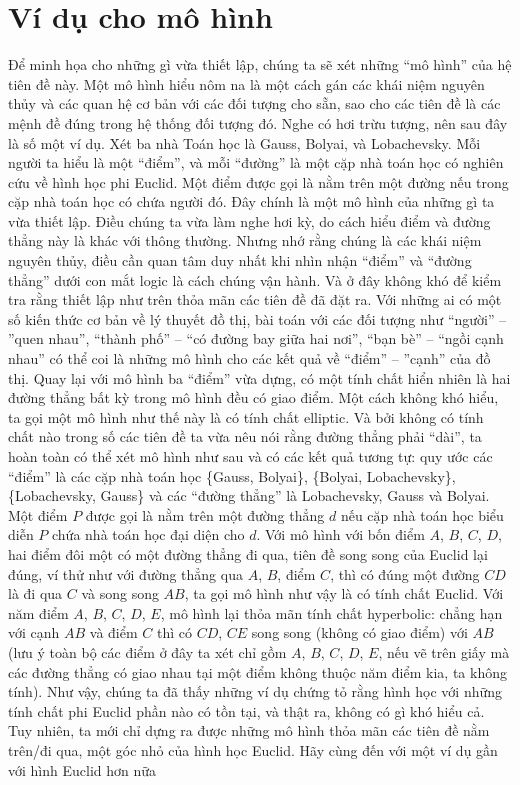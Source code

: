 \section{Ví dụ cho mô hình}
	Để minh họa cho những gì vừa thiết lập, chúng ta sẽ xét những ``mô hình'' của hệ tiên đề này. Một mô hình hiểu nôm na là một cách gán các khái niệm nguyên thủy và các quan hệ cơ bản với các đối tượng cho sẵn, sao cho các tiên đề là các mệnh đề đúng trong hệ thống đối tượng đó. Nghe có hơi trừu tượng, nên sau đây là số một ví dụ.
	\vskip 0.1cm
 Xét ba nhà Toán học là Gauss, Bolyai, và Lobachevsky. Mỗi người ta hiểu là một ``điểm'', và mỗi ``đường'' là một cặp nhà toán học có nghiên cứu về hình học phi Euclid. Một điểm được gọi là nằm trên một đường nếu trong cặp nhà toán học có chứa người đó. Đây chính là một mô hình của những gì ta vừa thiết lập.
	\vskip 0.1cm
	Điều chúng ta vừa làm nghe hơi kỳ, do cách hiểu điểm và đường thẳng này là khác với thông thường. Nhưng nhớ rằng chúng là các khái niệm nguyên thủy, điều cần quan tâm duy nhất khi nhìn nhận ``điểm'' và ``đường thẳng'' dưới con mắt logic là cách chúng vận hành. Và ở đây không khó để kiểm tra rằng thiết lập như trên thỏa mãn các tiên đề đã đặt ra. Với những ai có một số kiến thức cơ bản về lý thuyết đồ thị, bài toán với các đối tượng như ``người'' -- ''quen nhau'', ``thành phố'' -- ``có đường bay giữa hai nơi'', ``bạn bè'' -- ``ngồi cạnh nhau'' có thể coi là những mô hình cho các kết quả về ``điểm'' -- ''cạnh'' của đồ thị. 
	\vskip 0.1cm
	Quay lại với mô hình ba ``điểm'' vừa dựng, có một tính chất hiển nhiên là hai đường thẳng bất kỳ trong mô hình đều có giao điểm. Một cách không khó hiểu, ta gọi một mô hình như thế này là có tính chất elliptic.
	\vskip 0.1cm
	Và bởi không có tính chất nào trong số các tiên đề ta vừa nêu nói rằng đường thẳng phải ``dài'', ta hoàn toàn có thể xét mô hình như sau và có các kết quả tương tự: quy ước các ``điểm'' là các cặp nhà toán học \{Gauss, Bolyai\}, \{Bolyai, Lobachevsky\}, \{Lobachevsky, Gauss\} và các ``đường thẳng'' là Lobachevsky, Gauss và Bolyai. Một điểm $P$ được gọi là nằm trên một đường thẳng $d$ nếu cặp nhà toán học biểu diễn $P$ chứa nhà toán học đại diện cho $d$. 
	\vskip 0.1cm
	Với mô hình với bốn điểm $A$, $B$, $C$, $D$, hai điểm đôi một có một đường thẳng đi qua, tiên đề song song của Euclid lại đúng, ví thử như với đường thẳng qua $A$, $B$, điểm $C$, thì có đúng một đường $CD$ là đi qua $C$ và song song $AB$, ta gọi mô hình như vậy là có tính chất Euclid. Với năm điểm $A$, $B$, $C$, $D$, $E$, mô hình lại thỏa mãn tính chất hyperbolic: chẳng hạn với cạnh $AB$ và điểm $C$ thì có $CD$, $CE$ song song (không có giao điểm) với $AB$ (lưu ý toàn bộ các điểm ở đây ta xét chỉ gồm $A$, $B$, $C$, $D$, $E$, nếu vẽ trên giấy mà các đường thẳng có giao nhau tại một điểm không thuộc năm điểm kia, ta không tính).
	\vskip 0.1cm
Như vậy, chúng ta đã thấy những ví dụ chứng tỏ rằng hình học với những tính chất phi Euclid phần nào có tồn tại, và thật ra, không có gì khó hiểu cả. Tuy nhiên, ta mới chỉ dựng ra được những mô hình thỏa mãn các tiên đề nằm trên/đi qua, một góc nhỏ của hình học Euclid. Hãy cùng đến với một ví dụ gần với hình Euclid hơn nữa

